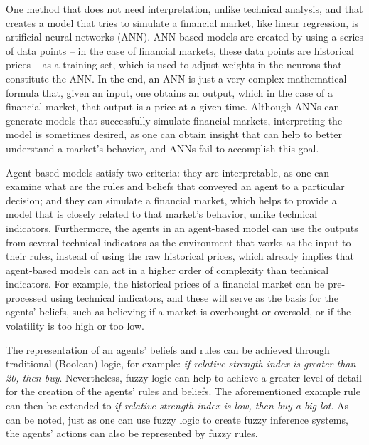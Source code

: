 \documentclass[review]{elsarticle}
\begin{document}
One method that does not need interpretation, unlike technical analysis, and that creates a model that tries to simulate a financial market, like linear regression, is artificial neural networks (ANN). ANN-based models are created by using a series of data points -- in the case of financial markets, these data points are historical prices -- as a training set, which is used to adjust weights in the neurons that constitute the ANN. In the end, an ANN is just a very complex mathematical formula that, given an input, one obtains an output, which in the case of a financial market, that output is a price at a given time. Although ANNs can generate models that successfully simulate financial markets, interpreting the model is sometimes desired, as one can obtain insight that can help to better understand a market's behavior, and ANNs fail to accomplish this goal.

Agent-based models satisfy two criteria: they are interpretable, as one can examine what are the rules and beliefs that conveyed an agent to a particular decision; and they can simulate a financial market, which helps to provide a model that is closely related to that market's behavior, unlike technical indicators. %
Furthermore, the agents in an agent-based model can use the outputs from several technical indicators as the environment that works as the input to their rules, instead of using the raw historical prices, which already implies that agent-based models can act in a higher order of complexity than technical indicators. For example, the historical prices of a financial market can be pre-processed using technical indicators, and these will serve as the basis for the agents' beliefs, such as believing if a market is overbought or oversold, or if the volatility is too high or too low.

The representation of an agents' beliefs and rules can be achieved through traditional (Boolean) logic, for example: \textit{if relative strength index is greater than 20, then buy}. Nevertheless, fuzzy logic can help to achieve a greater level of detail for the creation of the agents' rules and beliefs. The aforementioned example rule can then be extended to \textit{if relative strength index is low, then buy a big lot}. As can be noted, just as one can use fuzzy logic to create fuzzy inference systems, the agents' actions can also be represented by fuzzy rules.
\end{document}
